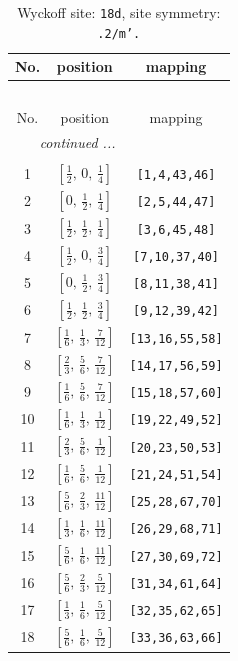\documentclass[fleqn,8pt]{jsarticle}
\begin{document}
\begin{longtable}{ccc}
\caption{Wyckoff site: {\tt 18d}, site symmetry: {\tt .2/m'.}}
 \\
 \hline \hline
No. & position & mapping \\ \hline \endfirsthead

\multicolumn{2}{l}{\tablename\ \thetable{}} \\
 \hline \hline
No. & position & mapping \\ \hline \endhead

 \hline \hline
\multicolumn{2}{r}{\footnotesize\it continued ...} \\ \endfoot

 \hline \hline
\multicolumn{2}{r}{} \\ \endlastfoot

1 & $\left[ \frac{1}{2},\, 0,\, \frac{1}{4} \right]$ & {\tt [1,4,43,46]} \\ \hline
2 & $\left[ 0,\, \frac{1}{2},\, \frac{1}{4} \right]$ & {\tt [2,5,44,47]} \\ \hline
3 & $\left[ \frac{1}{2},\, \frac{1}{2},\, \frac{1}{4} \right]$ & {\tt [3,6,45,48]} \\ \hline
4 & $\left[ \frac{1}{2},\, 0,\, \frac{3}{4} \right]$ & {\tt [7,10,37,40]} \\ \hline
5 & $\left[ 0,\, \frac{1}{2},\, \frac{3}{4} \right]$ & {\tt [8,11,38,41]} \\ \hline
6 & $\left[ \frac{1}{2},\, \frac{1}{2},\, \frac{3}{4} \right]$ & {\tt [9,12,39,42]} \\ \hline
7 & $\left[ \frac{1}{6},\, \frac{1}{3},\, \frac{7}{12} \right]$ & {\tt [13,16,55,58]} \\ \hline
8 & $\left[ \frac{2}{3},\, \frac{5}{6},\, \frac{7}{12} \right]$ & {\tt [14,17,56,59]} \\ \hline
9 & $\left[ \frac{1}{6},\, \frac{5}{6},\, \frac{7}{12} \right]$ & {\tt [15,18,57,60]} \\ \hline
10 & $\left[ \frac{1}{6},\, \frac{1}{3},\, \frac{1}{12} \right]$ & {\tt [19,22,49,52]} \\ \hline
11 & $\left[ \frac{2}{3},\, \frac{5}{6},\, \frac{1}{12} \right]$ & {\tt [20,23,50,53]} \\ \hline
12 & $\left[ \frac{1}{6},\, \frac{5}{6},\, \frac{1}{12} \right]$ & {\tt [21,24,51,54]} \\ \hline
13 & $\left[ \frac{5}{6},\, \frac{2}{3},\, \frac{11}{12} \right]$ & {\tt [25,28,67,70]} \\ \hline
14 & $\left[ \frac{1}{3},\, \frac{1}{6},\, \frac{11}{12} \right]$ & {\tt [26,29,68,71]} \\ \hline
15 & $\left[ \frac{5}{6},\, \frac{1}{6},\, \frac{11}{12} \right]$ & {\tt [27,30,69,72]} \\ \hline
16 & $\left[ \frac{5}{6},\, \frac{2}{3},\, \frac{5}{12} \right]$ & {\tt [31,34,61,64]} \\ \hline
17 & $\left[ \frac{1}{3},\, \frac{1}{6},\, \frac{5}{12} \right]$ & {\tt [32,35,62,65]} \\ \hline
18 & $\left[ \frac{5}{6},\, \frac{1}{6},\, \frac{5}{12} \right]$ & {\tt [33,36,63,66]} \\
\end{longtable}
\end{document}
